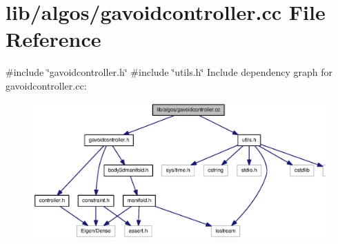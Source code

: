 \section{lib/algos/gavoidcontroller.cc \-File \-Reference}
\label{gavoidcontroller_8cc}
{\ttfamily \#include \char`\"{}gavoidcontroller.\-h\char`\"{}}\*
{\ttfamily \#include \char`\"{}utils.\-h\char`\"{}}\*
\-Include dependency graph for gavoidcontroller.\-cc\-:
\nopagebreak
\begin{figure}[H]
\begin{center}
\leavevmode
\includegraphics[width=350pt]{gavoidcontroller_8cc__incl}
\end{center}
\end{figure}
